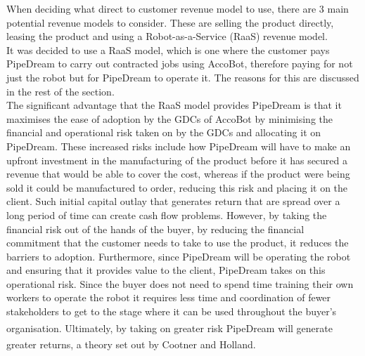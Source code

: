 \documentclass[11pt]{article}		%
\newcommand{\supercite}[1]{\textsuperscript{\cite{#1}}}		%
\begin{document}
            When deciding what direct to customer revenue model to use, there are 3 main potential revenue models to consider. These are selling the product directly, leasing the product and using a Robot-as-a-Service (RaaS) revenue model.
         \\ 
            \hspace*{2ex}
            It was decided to use a RaaS model, which is one where the customer pays PipeDream to carry out contracted jobs using AccoBot, therefore paying for not just the robot but for PipeDream to operate it. The reasons for this are discussed in the rest of the section.
            \\ 
            \hspace*{2ex}The significant advantage that the RaaS model provides PipeDream is that it maximises the ease of adoption by the GDCs of AccoBot by minimising the financial and operational risk taken on by the GDCs and allocating it on PipeDream. These increased risks include how PipeDream will have to make an upfront investment in the manufacturing of the product before it has secured a revenue that would be able to cover the cost, whereas if the product were being sold it could be manufactured to order, reducing this risk and placing it on the client. Such initial capital outlay that generates return that are spread over a long period of time can create cash flow problems. However, by taking the financial risk out of the hands of the buyer, by reducing the financial commitment that the customer needs to take to use the product, it reduces the barriers to adoption. Furthermore, since PipeDream will be operating the robot and ensuring that it provides value to the client, PipeDream takes on this operational risk. Since the buyer does not need to spend time training their own workers to operate the robot it requires less time and coordination of fewer stakeholders to get to the stage where it can be used throughout the buyer’s organisation\supercite{RaaS}. Ultimately, by taking on greater risk PipeDream will generate greater returns, a theory set out by Cootner and Holland\supercite{risk-return}.
            \\
\end{document}
